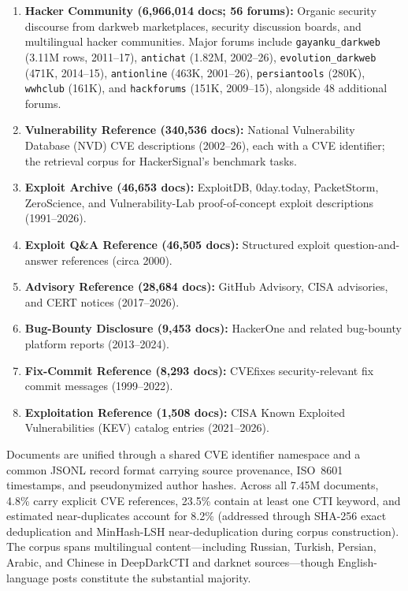 \documentclass[12pt]{article}
\begin{document}
\begin{enumerate}
  \item \textbf{Hacker Community (6,966,014 docs; 56 forums):} Organic security discourse from darkweb marketplaces, security discussion boards, and multilingual hacker communities. Major forums include \texttt{gayanku\_darkweb} (3.11M rows, 2011--17), \texttt{antichat} (1.82M, 2002--26), \texttt{evolution\_darkweb} (471K, 2014--15), \texttt{antionline} (463K, 2001--26), \texttt{persiantools} (280K), \texttt{wwhclub} (161K), and \texttt{hackforums} (151K, 2009--15), alongside 48 additional forums.
  \item \textbf{Vulnerability Reference (340,536 docs):} National Vulnerability Database (NVD) CVE descriptions (2002--26), each with a CVE identifier; the retrieval corpus for HackerSignal's benchmark tasks.
  \item \textbf{Exploit Archive (46,653 docs):} ExploitDB, 0day.today, PacketStorm, ZeroScience, and Vulnerability-Lab proof-of-concept exploit descriptions (1991--2026).
  \item \textbf{Exploit Q\&A Reference (46,505 docs):} Structured exploit question-and-answer references (circa 2000).
  \item \textbf{Advisory Reference (28,684 docs):} GitHub Advisory, CISA advisories, and CERT notices (2017--2026).
  \item \textbf{Bug-Bounty Disclosure (9,453 docs):} HackerOne and related bug-bounty platform reports (2013--2024).
  \item \textbf{Fix-Commit Reference (8,293 docs):} CVEfixes security-relevant fix commit messages (1999--2022).
  \item \textbf{Exploitation Reference (1,508 docs):} CISA Known Exploited Vulnerabilities (KEV) catalog entries (2021--2026).
\end{enumerate}

Documents are unified through a shared CVE identifier namespace and a common JSONL record format carrying source provenance, ISO~8601 timestamps, and pseudonymized author hashes. Across all 7.45M documents, 4.8\% carry explicit CVE references, 23.5\% contain at least one CTI keyword, and estimated near-duplicates account for 8.2\% (addressed through SHA-256 exact deduplication and MinHash-LSH near-deduplication during corpus construction). The corpus spans multilingual content---including Russian, Turkish, Persian, Arabic, and Chinese in DeepDarkCTI and darknet sources---though English-language posts constitute the substantial majority.
\end{document}
